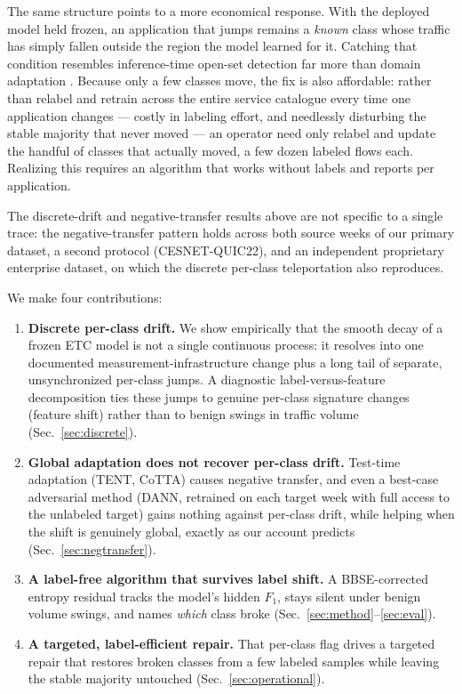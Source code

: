 The same structure points to a more economical response. With the deployed model
held frozen, an application that jumps remains a \emph{known} class whose traffic has
simply fallen outside the region the model learned for it. Catching that condition
resembles inference-time open-set detection far more than domain adaptation
\cite{bendale2016openmax}. Because only a few classes move, the fix is also
affordable: rather than relabel and retrain across the entire service catalogue every
time one application changes --- costly in labeling effort, and needlessly disturbing
the stable majority that never moved --- an operator need only relabel and update the
handful of classes that actually moved, a few dozen labeled flows each. Realizing
this requires an algorithm that works without labels and reports per application.

The discrete-drift and negative-transfer results above are not specific to a single
trace: the negative-transfer pattern holds across both source weeks of our primary
dataset, a second protocol
(CESNET-QUIC22), and an independent proprietary enterprise dataset, on which the
discrete per-class teleportation also reproduces.

We make four contributions:
\begin{enumerate}[leftmargin=1.4em]
  \item \textbf{Discrete per-class drift.} We show empirically that the smooth decay
        of a frozen ETC model is not a single continuous process: it resolves into
        one documented measurement-infrastructure change plus a long tail of
        separate, unsynchronized per-class jumps. A diagnostic label-versus-feature
        decomposition ties these jumps to
        genuine per-class signature changes (feature shift) rather than to benign
        swings in traffic volume (Sec.~\ref{sec:discrete}).
  \item \textbf{Global adaptation does not recover per-class drift.} Test-time
        adaptation (TENT, CoTTA) causes negative transfer, and even a best-case
        adversarial method (DANN, retrained on each target week with full access to
        the unlabeled target) gains nothing against per-class drift, while helping
        when the shift is genuinely global, exactly as our account predicts
        (Sec.~\ref{sec:negtransfer}).
  \item \textbf{A label-free algorithm that survives label shift.} A BBSE-corrected
        entropy residual tracks the model's hidden $F_1$, stays
        silent under benign volume swings, and names \emph{which} class broke
        (Sec.~\ref{sec:method}--\ref{sec:eval}).
  \item \textbf{A targeted, label-efficient repair.} That per-class flag drives a
        targeted repair that restores broken classes from a few labeled samples
        while leaving the stable majority untouched (Sec.~\ref{sec:operational}).
\end{enumerate}


